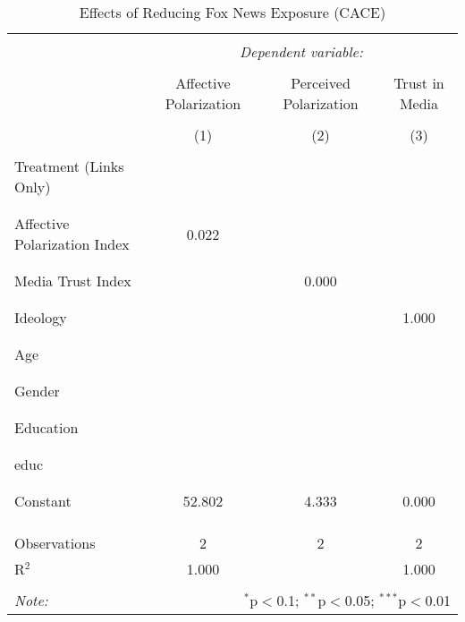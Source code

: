 
\begin{table}[!htbp] \centering 
  \caption{Effects of Reducing Fox News Exposure (CACE)} 
  \label{} 
\begin{tabular}{@{\extracolsep{5pt}}lccc} 
\\[-1.8ex]\hline 
\hline \\[-1.8ex] 
 & \multicolumn{3}{c}{\textit{Dependent variable:}} \\ 
\cline{2-4} 
\\[-1.8ex] & Affective Polarization & Perceived Polarization & Trust in Media \\ 
\\[-1.8ex] & (1) & (2) & (3)\\ 
\hline \\[-1.8ex] 
 Treatment (Links Only) &  &  &  \\ 
  &  &  &  \\ 
  & & & \\ 
 Affective Polarization Index & 0.022 &  &  \\ 
  &  &  &  \\ 
  & & & \\ 
 Media Trust Index &  & 0.000 &  \\ 
  &  &  &  \\ 
  & & & \\ 
 Ideology &  &  & 1.000 \\ 
  &  &  &  \\ 
  & & & \\ 
 Age &  &  &  \\ 
  &  &  &  \\ 
  & & & \\ 
 Gender &  &  &  \\ 
  &  &  &  \\ 
  & & & \\ 
 Education &  &  &  \\ 
  &  &  &  \\ 
  & & & \\ 
 educ &  &  &  \\ 
  &  &  &  \\ 
  & & & \\ 
 Constant & 52.802 & 4.333 & 0.000 \\ 
  &  &  &  \\ 
  & & & \\ 
\hline \\[-1.8ex] 
Observations & 2 & 2 & 2 \\ 
R$^{2}$ & 1.000 &  & 1.000 \\ 
\hline 
\hline \\[-1.8ex] 
\textit{Note:}  & \multicolumn{3}{r}{$^{*}$p$<$0.1; $^{**}$p$<$0.05; $^{***}$p$<$0.01} \\ 
\end{tabular} 
\end{table} 
